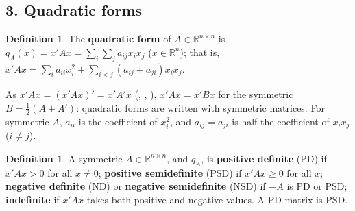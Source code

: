 \documentclass[12pt]{article}
\newcommand{\R}{\mathbb R}
\theoremstyle{definition}
\newtheorem{definition}[theorem]{Definition}
\begin{document}
\subsection*{3. Quadratic forms}

\begin{definition}\label{h-def-quadratic-form}
The \textbf{quadratic form} of \(A\in\R^{n\times n}\) is \(q_A(x)=x'Ax=\sum_i\sum_ja_{ij}x_ix_j\) (\(x\in\R^n\)); that is,
\(x'Ax=\sum_ia_{ii}x_i^2+\sum_{i<j}(a_{ij}+a_{ji})x_ix_j\).
\end{definition}
As \(x'Ax=(x'Ax)'=x'A'x\) (, , ), \(x'Ax=x'Bx\) for the symmetric \(B=\frac12(A+A')\): quadratic forms are
written with symmetric matrices. For symmetric \(A\), \(a_{ii}\) is the coefficient of \(x_i^2\), and \(a_{ij}=a_{ji}\) is
half the coefficient of \(x_ix_j\) (\(i\ne j\)).

\begin{definition}\label{h-def-definite}
A symmetric \(A\in\R^{n\times n}\), and \(q_A\), is \textbf{positive definite} (PD) if \(x'Ax>0\) for all \(x\ne0\);
\textbf{positive semidefinite} (PSD) if \(x'Ax\geqslant0\) for all \(x\); \textbf{negative definite} (ND) or
\textbf{negative semidefinite} (NSD) if \(-A\) is PD or PSD; \textbf{indefinite} if \(x'Ax\) takes both positive and
negative values. A PD matrix is PSD.
\end{definition}
\end{document}
